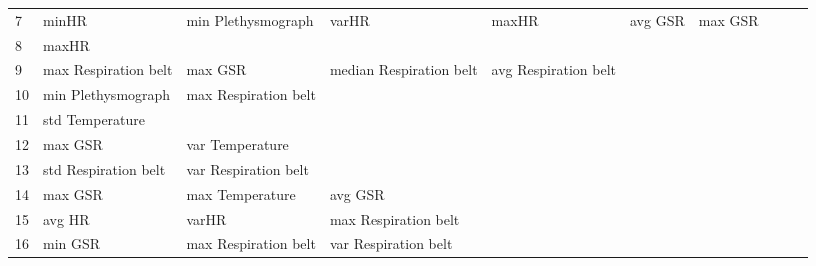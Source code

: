 \begin{landscape}
\begin{table}[]
\begin{tabular}{l|llllllll}
7        & minHR                   & min Plethysmograph    & varHR                   & maxHR                   & avg GSR                 & max GSR               &                      &          &                      &        \\
8        & maxHR                   &                       &                         &                         &                         &                       &                      &          &                      &        \\
9        & max Respiration belt    & max GSR               & median Respiration belt & avg Respiration belt    &                         &                       &                      &          &                      &        \\
10       & min Plethysmograph      & max Respiration belt  &                         &                         &                         &                       &                      &          &                      &        \\
11       & std Temperature         &                       &                         &                         &                         &                       &                      &          &                      &        \\
12       & max GSR                 & var Temperature       &                         &                         &                         &                       &                      &          &                      &        \\
13       & std Respiration belt    & var Respiration belt  &                         &                         &                         &                       &                      &          &                      &        \\
14       & max GSR                 & max Temperature       & avg GSR                 &                         &                         &                       &                      &          &                      &        \\
15       & avg HR                  & varHR                 & max Respiration belt    &                         &                         &                       &                      &          &                      &        \\
16       & min GSR                 & max Respiration belt  & var Respiration belt    &                         &                         &                       &                      &          &                      &        \\

\end{tabular}
\end{table}
\end{landscape}
